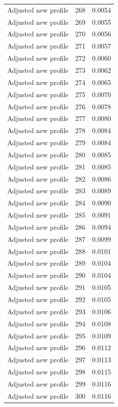 \begin{table}[htbp]
\begin{tabular}{lll}
Adjusted new profile & 268 & 0.0054 \\
Adjusted new profile & 269 & 0.0055 \\
Adjusted new profile & 270 & 0.0056 \\
Adjusted new profile & 271 & 0.0057 \\
Adjusted new profile & 272 & 0.0060 \\
Adjusted new profile & 273 & 0.0062 \\
Adjusted new profile & 274 & 0.0065 \\
Adjusted new profile & 275 & 0.0070 \\
Adjusted new profile & 276 & 0.0078 \\
Adjusted new profile & 277 & 0.0080 \\
Adjusted new profile & 278 & 0.0084 \\
Adjusted new profile & 279 & 0.0084 \\
Adjusted new profile & 280 & 0.0085 \\
Adjusted new profile & 281 & 0.0085 \\
Adjusted new profile & 282 & 0.0086 \\
Adjusted new profile & 283 & 0.0089 \\
Adjusted new profile & 284 & 0.0090 \\
Adjusted new profile & 285 & 0.0091 \\
Adjusted new profile & 286 & 0.0094 \\
Adjusted new profile & 287 & 0.0099 \\
Adjusted new profile & 288 & 0.0101 \\
Adjusted new profile & 289 & 0.0104 \\
Adjusted new profile & 290 & 0.0104 \\
Adjusted new profile & 291 & 0.0105 \\
Adjusted new profile & 292 & 0.0105 \\
Adjusted new profile & 293 & 0.0106 \\
Adjusted new profile & 294 & 0.0108 \\
Adjusted new profile & 295 & 0.0109 \\
Adjusted new profile & 296 & 0.0112 \\
Adjusted new profile & 297 & 0.0113 \\
Adjusted new profile & 298 & 0.0115 \\
Adjusted new profile & 299 & 0.0116 \\
Adjusted new profile & 300 & 0.0116 \\

\end{tabular}
\end{table}
